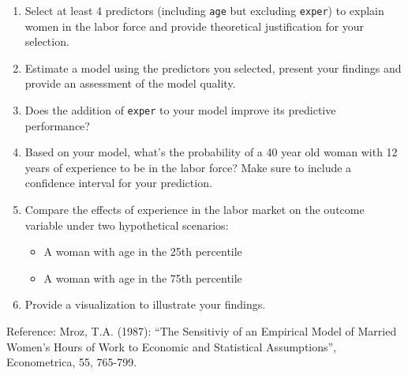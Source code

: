 \documentclass[]{article}
\providecommand{\tightlist}{%
  \setlength{\itemsep}{0pt}\setlength{\parskip}{0pt}}
\theoremstyle{definition}
\theoremstyle{definition}
\theoremstyle{remark}
\begin{document}
\begin{enumerate}
\def\labelenumi{\arabic{enumi}.}
\item
  Select at least 4 predictors (including \texttt{age} but excluding
  \texttt{exper}) to explain women in the labor force and provide
  theoretical justification for your selection.
\item
  Estimate a model using the predictors you selected, present your
  findings and provide an assessment of the model quality.
\item
  Does the addition of \texttt{exper} to your model improve its
  predictive performance?
\item
  Based on your model, what's the probability of a 40 year old woman
  with 12 years of experience to be in the labor force? Make sure to
  include a confidence interval for your prediction.
\item
  Compare the effects of experience in the labor market on the outcome
  variable under two hypothetical scenarios:

  \begin{itemize}
  \tightlist
  \item
    A woman with age in the 25th percentile
  \item
    A woman with age in the 75th percentile
  \end{itemize}
\item
  Provide a visualization to illustrate your findings.
\end{enumerate}

Reference: Mroz, T.A. (1987): ``The Sensitiviy of an Empirical Model of
Married Women's Hours of Work to Economic and Statistical Assumptions'',
Econometrica, 55, 765-799.
\end{document}
